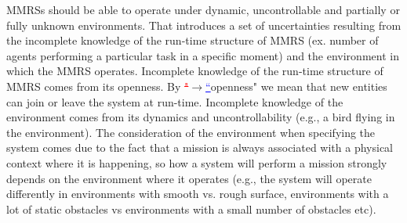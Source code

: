 \documentclass[journal]{IEEEtran}
\theoremstyle{definition}
\newcommand{\ra}{$\rightarrow$}
\newcommand{\chg}[2]{\textcolor{red}{\sout{#1}}{\ra}\textcolor{blue}{\uline{#2}}} %
\newcommand\patrizio[1]{\nb{Patrizio}{#1}}
\newcommand\ivano[1]{\nb{Ivano}{#1}}
\begin{document}
 

 MMRSs should be able to operate under dynamic, uncontrollable and partially or fully unknown environments.
That introduces a set of uncertainties resulting from the incomplete knowledge of the run-time structure of MMRS (ex. number of agents performing a particular task in a specific moment) and the environment in which the MMRS operates. Incomplete knowledge of the run-time structure of MMRS comes from its openness. By \chg{"}{``}openness" we mean that new entities can join or leave the system at run-time. Incomplete knowledge of the environment comes from its dynamics and uncontrollability (e.g., a bird flying in the environment). The consideration of the environment when specifying the system comes due to the fact that a mission is always associated with a physical context where it is happening, so how a system will perform a mission strongly depends on the environment where it operates (e.g., the system will operate differently in environments with smooth vs. rough surface, environments  with a lot of static obstacles vs environments with a small number of obstacles etc). 
\end{document}
